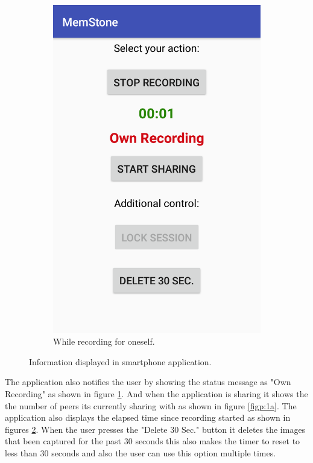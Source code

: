 \documentclass[mscthesis]{usiinfthesis}
\begin{document}
\begin{figure} [!ht]
\begin{subfigure}{0.31\textwidth}
\includegraphics[width=\linewidth]{Recording}
\caption{While recording for oneself.} \label{figp:1b}
\end{subfigure}
\caption{Information displayed in smartphone application.} \label{figp:1}
\end{figure}

The application also notifies the user by showing the status message as "Own Recording" as shown in figure \ref{figp:1b}. And when the application is sharing it shows the the number of peers its currently sharing with as shown in figure \ref{figp:1a}. The application also displays the elapsed time since recording started as shown in figures \ref{figp:1}. When the user presses the "Delete 30 Sec." button it deletes the images that been captured for the past 30 seconds this also makes the timer to reset to less than 30 seconds and also the user can use this option multiple times. 
\end{document}
